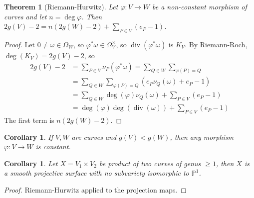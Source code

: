 \documentclass{article}
\theoremstyle{definition}
\theoremstyle{remark}
\theoremstyle{plain}
\newtheorem{thm}[defn]{Theorem}
\newtheorem{crly}[defn]{Corollary}
\newcommand{\PP}{\mathbb{P}}
\newcommand{\divi}{\operatorname{div}}
\begin{document}
\begin{thm}[Riemann-Hurwitz]
    Let $\varphi:V\to W$ be a non-constant morphism of curves and let $n=\deg\varphi$. Then $2g(V)-2=n(2g(W)-2)+\sum_{P\in V}(e_P-1)$.
\end{thm}
\begin{proof}
    Let $0\neq \omega\in\Omega_W$, so $\varphi^\ast\omega\in\Omega_V^\times$, so $\divi(\varphi^\ast\omega)$ is $K_V$. By Riemann-Roch, $\deg(K_V)=2g(V)-2$, so \begin{align*}2g(V)-2&=\sum_{P\in V}\nu_P(\varphi^\ast\omega)=\sum_{Q\in W}\sum_{\varphi(P)=Q}\\
    &=\sum_{Q\in W}\sum_{\varphi(P)=Q}(e_P\nu_Q(\omega)+e_P-1)\\
    &=\sum_{Q\in W}\deg(\varphi)\nu_Q(\omega)+\sum_{P\in V}(e_P-1)\\
    &=\deg(\varphi)\deg(\divi(\omega))+\sum_{P\in V}(e_P-1)\end{align*} The first term is $n(2g(W)-2)$.
\end{proof}
\begin{crly}
    If $V, W$ are curves and $g(V)<g(W)$, then any morphism $\varphi:V\to W$ is constant.
\end{crly}
\begin{crly}
    Let $X=V_1\times V_2$ be product of two curves of genus $\ge 1$, then $X$ is a smooth projective surface with no subvariety isomorphic to $\PP^1$.
\end{crly}
\begin{proof}
    Riemann-Hurwitz applied to the projection maps.
\end{proof}
\end{document}
